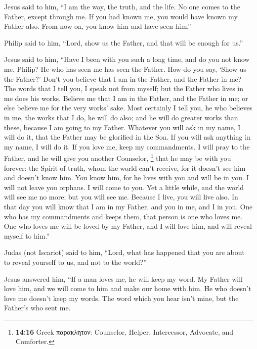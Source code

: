  Jesus said to him, ``I am the way, the truth, and the
life. No one comes to the Father, except through me.  If
you had known me, you would have known my Father also. From now on, you
know him and have seen him.''

 Philip said to him, ``Lord, show us the Father, and that
will be enough for us.''

 Jesus said to him, ``Have I been with you such a long
time, and do you not know me, Philip? He who has seen me has seen the
Father. How do you say, `Show us the Father?'  Don't you
believe that I am in the Father, and the Father in me? The words that I
tell you, I speak not from myself; but the Father who lives in me does
his works.  Believe me that I am in the Father, and the
Father in me; or else believe me for the very works' sake.
 Most certainly I tell you, he who believes in me, the
works that I do, he will do also; and he will do greater works than
these, because I am going to my Father.  Whatever you
will ask in my name, I will do it, that the Father may be glorified in
the Son.  If you will ask anything in my name, I will do
it.  If you love me, keep my commandments.
 I will pray to the Father, and he will give you another
Counselor, \footnote{\textbf{14:16} Greek παρακλητον: Counselor, Helper,
  Intercessor, Advocate, and Comforter.} that he may be with you
forever:  the Spirit of truth, whom the world can't
receive, for it doesn't see him and doesn't know him. You know him, for
he lives with you and will be in you.  I will not leave
you orphans. I will come to you.  Yet a little while, and
the world will see me no more; but you will see me. Because I live, you
will live also.  In that day you will know that I am in
my Father, and you in me, and I in you.  One who has my
commandments and keeps them, that person is one who loves me. One who
loves me will be loved by my Father, and I will love him, and will
reveal myself to him.''

 Judas (not Iscariot) said to him, ``Lord, what has
happened that you are about to reveal yourself to us, and not to the
world?''

 Jesus answered him, ``If a man loves me, he will keep my
word. My Father will love him, and we will come to him and make our home
with him.  He who doesn't love me doesn't keep my words.
The word which you hear isn't mine, but the Father's who sent me.

